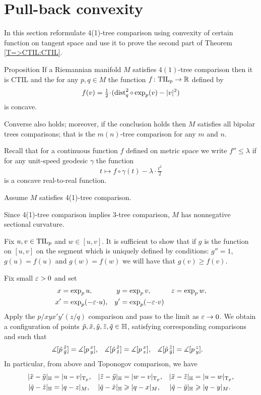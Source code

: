 \section{Pull-back convexity}\label{convexity}

In this section reformulate 4(1)-tree comparison using convexity of certain function on tangent space and use it to prove the second part of Theorem \ref{T=>CTIL:CTIL}.

\begin{thm}{Proposition}\label{prop:convexity}
If a Riemannian manifold $M$ satisfies $4(1)$-tree comparison then it is CTIL and the for any $p,q\in M$ the function $f\: \TIL_p\to \RR$ defined by
\[f(v)=\tfrac12\cdot(\dist_q^2\circ\exp_p(v)-|v|^2)\] 
is concave.

Converse also holds; moreover, if the conclusion holds then $M$ satisfies all bipolar trees comparisons; that is the $m(n)$-tree comparison for any $m$ and $n$.
\end{thm}



Recall that for a continuous function $f$ defined on metric space we write 
$f''\le \lambda$ if for any unit-speed geodesic $\gamma$ the function
\[t\mapsto f\circ\gamma(t)-\lambda\cdot \tfrac{t^2}{2}\]
is a concave real-to-real function.

Assume $M$ satisfies 4(1)-tree comparison.

Since 4(1)-tree comparison implies 3-tree comparison,
$M$ has nonnegative sectional curvature.

Fix $u,v\in \TIL_p$ and $w\in [u,v]$.
It is sufficient to show that if $g$ is the function on $[u,v]$ on the segment which is 
uniquely defined by conditions:
$g''=1$, $g(u)=f(u)$ and $g(w)=f(w)$ we will have that $g(v)\ge f(v)$.

Fix small $\eps>0$ and set
\begin{align*}
x&=\exp_p u, 
&y&=\exp_p v, 
&z&=\exp_pw,
\\
x'&=\exp_p(-\eps\cdot  u),
&y'&=\exp_p(-\eps\cdot  v)
\end{align*}
Apply the $p/xyx'y'(z/q)$ comparison and pass to the limit as $\eps\to 0$.
We obtain a configuration of points $\~p, \~x, \~y, \~z, \~q\in\HH$, satisfying corresponding comparisons and
such that
\begin{align*}
\measuredangle[\~p\,^{\~x}_{\~y}]&= \measuredangle[p\,^{x}_{y}],
&\measuredangle[\~p\,^{\~x}_{\~z}]&= \measuredangle[p\,^{x}_{z}],
&\measuredangle[\~p\,^{\~z}_{\~y}]&= \measuredangle[p\,^{z}_{y}].
\end{align*}
In particular,
from above and Toponogov comparison, we have
\begin{align*}
|\~x-\~y|_\HH&=|u-v|_{\T_p},
&|\~z-\~y|_\HH&=|w-v|_{\T_p},
&|\~x-\~z|_\HH&=|u-w|_{\T_p},
\\
|\~q-\~z|_\HH&=|q-z|_M,
&|\~q-\~x|_\HH&\ge|q-x|_M,
&|\~q-\~y|_\HH&\ge|q-y|_M.
\end{align*}

